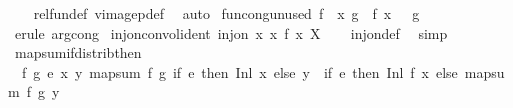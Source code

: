 \begin{isabellebody}
%
\isadelimproof
\ \ %
\endisadelimproof
%
\isatagproof
{}\isamarkupfalse%
\ rel{\isacharunderscore}{\kern0pt}fun{\isacharunderscore}{\kern0pt}def\ vimage{}p{\isacharunderscore}{\kern0pt}def\ \isamarkupfalse%
\ auto%
\endisatagproof
{\isafoldproof}%
%
\isadelimproof
\isanewline
%
\endisadelimproof
\isanewline
{}\isamarkupfalse%
\ fun{\isacharunderscore}{\kern0pt}cong{\isacharunderscore}{\kern0pt}unused{\isacharunderscore}{\kern0pt}{}{\isacharcolon}{\kern0pt}\ {\isachardoublequoteopen}f\ {\isacharequal}{\kern0pt}\ {\isacharparenleft}{\kern0pt}{\isasymlambda}x{\isachardot}{\kern0pt}\ g{\isacharparenright}{\kern0pt}\ {\isasymLongrightarrow}\ f\ {\isacharparenleft}{\kern0pt}{\isasymlambda}x{\isachardot}{\kern0pt}\ {}{\isacharparenright}{\kern0pt}\ {\isacharequal}{\kern0pt}\ g{\isachardoublequoteclose}\isanewline
%
\isadelimproof
\ \ %
\endisadelimproof
%
\isatagproof
{}\isamarkupfalse%
\ {\isacharparenleft}{\kern0pt}erule\ arg{\isacharunderscore}{\kern0pt}cong{\isacharparenright}{\kern0pt}%
\endisatagproof
{\isafoldproof}%
%
\isadelimproof
\isanewline
%
\endisadelimproof
\isanewline
{}\isamarkupfalse%
\ inj{\isacharunderscore}{\kern0pt}on{\isacharunderscore}{\kern0pt}convol{\isacharunderscore}{\kern0pt}ident{\isacharcolon}{\kern0pt}\ {\isachardoublequoteopen}inj{\isacharunderscore}{\kern0pt}on\ {\isacharparenleft}{\kern0pt}{\isasymlambda}x{\isachardot}{\kern0pt}\ {\isacharparenleft}{\kern0pt}x{\isacharcomma}{\kern0pt}\ f\ x{\isacharparenright}{\kern0pt}{\isacharparenright}{\kern0pt}\ X{\isachardoublequoteclose}\isanewline
%
\isadelimproof
\ \ %
\endisadelimproof
%
\isatagproof
{}\isamarkupfalse%
\ inj{\isacharunderscore}{\kern0pt}on{\isacharunderscore}{\kern0pt}def\ \isamarkupfalse%
\ simp%
\endisatagproof
{\isafoldproof}%
%
\isadelimproof
\isanewline
%
\endisadelimproof
\isanewline
{}\isamarkupfalse%
\ map{\isacharunderscore}{\kern0pt}sum{\isacharunderscore}{\kern0pt}if{\isacharunderscore}{\kern0pt}distrib{\isacharunderscore}{\kern0pt}then{\isacharcolon}{\kern0pt}\isanewline
\ \ {\isachardoublequoteopen}{\isasymAnd}f\ g\ e\ x\ y{\isachardot}{\kern0pt}\ map{\isacharunderscore}{\kern0pt}sum\ f\ g\ {\isacharparenleft}{\kern0pt}if\ e\ then\ Inl\ x\ else\ y{\isacharparenright}{\kern0pt}\ {\isacharequal}{\kern0pt}\ {\isacharparenleft}{\kern0pt}if\ e\ then\ Inl\ {\isacharparenleft}{\kern0pt}f\ x{\isacharparenright}{\kern0pt}\ else\ map{\isacharunderscore}{\kern0pt}sum\ f\ g\ y{\isacharparenright}{\kern0pt}{\isachardoublequoteclose}\isanewline

\end{isabellebody}
